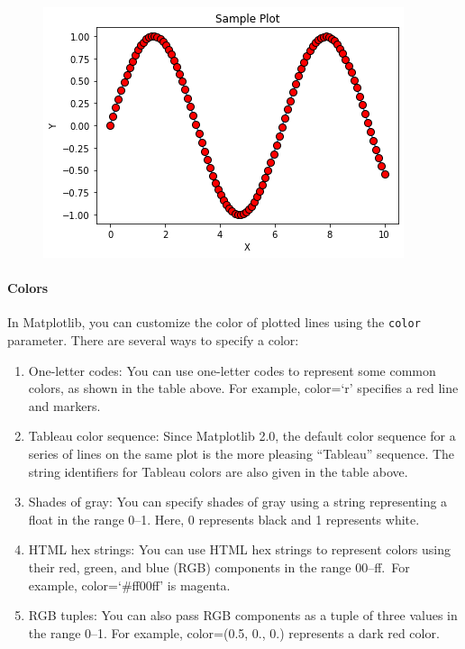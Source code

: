 \documentclass[11pt]{article}
\begin{document}
\begin{figure}
\centering
\includegraphics[scale=0.6]{marker_prop.png}
\end{figure}

\hypertarget{colors}{%
\paragraph{Colors}\label{colors}}

In Matplotlib, you can customize the color of plotted lines using the
\texttt{color} parameter. There are several ways to specify a color:

\begin{enumerate}
\def\labelenumi{\arabic{enumi}.}
\item
  One-letter codes: You can use one-letter codes to represent some
  common colors, as shown in the table above. For example, color=`r'
  specifies a red line and markers.
\item
  Tableau color sequence: Since Matplotlib 2.0, the default color
  sequence for a series of lines on the same plot is the more pleasing
  ``Tableau'' sequence. The string identifiers for Tableau colors are
  also given in the table above.
\item
  Shades of gray: You can specify shades of gray using a string
  representing a float in the range 0--1. Here, 0 represents black and 1
  represents white.
\item
  HTML hex strings: You can use HTML hex strings to represent colors
  using their red, green, and blue (RGB) components in the range
  00--ff.~For example, color=`\#ff00ff' is magenta.
\item
  RGB tuples: You can also pass RGB components as a tuple of three
  values in the range 0--1. For example, color=(0.5, 0., 0.) represents
  a dark red color.
\end{enumerate}
\end{document}
